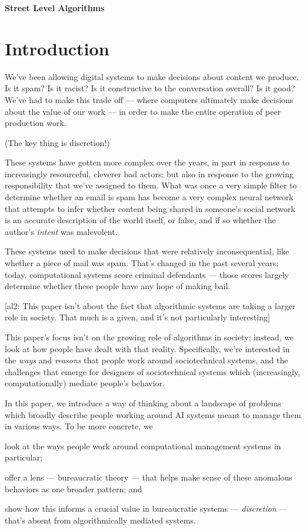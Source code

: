 \documentclass[10pt]{article}
\newcommand{\ali}[1]{{\color{Red}[al2: #1]}}
\begin{document}
\textbf{Street Level Algorithms}

\section{Introduction}
We've been allowing digital systems to make decisions about content we produce.
Is it spam?
Is it racist?
Is it constructive to the conversation overall?
Is it good?
We've had to make this trade off --- where computers ultimately make decisions about the value of our work --- in order to make the entire operation of peer production work.

(The key thing is discretion!)


These systems have gotten more complex over the years, in part in response to increasingly resourceful, cleverer bad actors; but also in response to the growing responsibility that we've assigned to them.
What was once a very simple filter to determine whether an email is spam has become a very complex neural network that attempts to infer whether content being shared in someone's social network is an accurate description of the world itself, or false, and if so whether the author's \textit{intent} was malevolent.

These systems used to make decisions that were relatively inconsequential, like whether a piece of mail was spam.
That's changed in the past several years; today, computational systems score criminal defendants --- those scores largely determine whether these people have any hope of making bail.


\ali{This paper isn't about the fact that algorithmic systems are taking a larger role in society.
That much is a given, and it's not particularly interesting}

This paper's focus isn't on the growing role of algorithms in society; instead,
we look at how people have dealt with that reality.
Specifically, we're interested in the \textit{ways} and \textit{reasons} that people work around sociotechnical systems, and
the challenges that emerge for designers of sociotechnical systems which (increasingly, computationally) mediate people's behavior.

In this paper, we introduce a way of thinking about a landscape of problems which broadly describe people working around AI systems meant to manage them in various ways.
To be more concrete, we
\begin{enumerate*}
  \item look at the ways people work around computational management systems in particular;
  \item offer a lens --- bureaucratic theory --- that helps make sense of these anomalous behaviors as one broader pattern; and
  \item show how this informs a crucial value in bureaucratic systems --- \textit{discretion} --- that's absent from algorithmically mediated systems.
\end{enumerate*}
\end{document}
